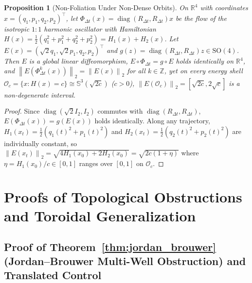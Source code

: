 \documentclass[10pt]{article}
\newtheorem{proposition}{Proposition}
\theoremstyle{definition}
\theoremstyle{remark}
\newcommand{\R}{\mathbb{R}}
\newcommand{\Sp}{\mathbb{S}}
\newcommand{\norm}[1]{\left\lVert #1 \right\rVert}
\DeclareMathOperator{\diag}{diag}
\begin{document}
\begin{proposition}[Non-Foliation Under Non-Dense Orbits]
\label{prop:resonant_ho}
On $\R^4$ with coordinates $x = (q_1, p_1, q_2, p_2)^\top$, let $\Phi_{\Delta t}(x) = \diag(R_{\Delta t}, R_{\Delta t}) x$ be the flow of the isotropic $1:1$ harmonic oscillator with Hamiltonian $H(x) = \frac{1}{2}(q_1^2 + p_1^2 + q_2^2 + p_2^2) = H_1(x) + H_2(x)$. Let $E(x) = (\sqrt{2}q_1, \sqrt{2}p_1, q_2, p_2)^\top$ and $g(z) = \diag(R_{\Delta t}, R_{\Delta t}) z \in \mathrm{SO}(4)$. Then $E$ is a global linear diffeomorphism, $E \circ \Phi_{\Delta t} = g \circ E$ holds identically on $\R^4$, and $\norm{E(\Phi_{\Delta t}^k(x))}_2 = \norm{E(x)}_2$ for all $k \in \mathbb{Z}$, yet on every energy shell $\mathcal{O}_c = \{x : H(x) = c\} \cong \Sp^3(\sqrt{2c})$ ($c > 0$), $\norm{E(\mathcal{O}_c)}_2 = [\sqrt{2c}, 2\sqrt{c}]$ is a non-degenerate interval.
\end{proposition}
\begin{proof}
Since $\diag(\sqrt{2}I_2, I_2)$ commutes with $\diag(R_{\Delta t}, R_{\Delta t})$, $E(\Phi_{\Delta t}(x)) = g(E(x))$ holds identically. Along any trajectory, $H_1(x_t) = \frac{1}{2}(q_1(t)^2 + p_1(t)^2)$ and $H_2(x_t) = \frac{1}{2}(q_2(t)^2 + p_2(t)^2)$ are individually constant, so $\norm{E(x_t)}_2 = \sqrt{4 H_1(x_0) + 2 H_2(x_0)} = \sqrt{2c(1 + \eta)}$ where $\eta = H_1(x_0)/c \in [0, 1]$ ranges over $[0, 1]$ on $\mathcal{O}_c$.
\end{proof}

\section{Proofs of Topological Obstructions and Toroidal Generalization}
\label{app:obstruction_proofs}

\subsection{Proof of Theorem~\ref{thm:jordan_brouwer} (Jordan--Brouwer Multi-Well Obstruction) and Translated Control}
\end{document}
